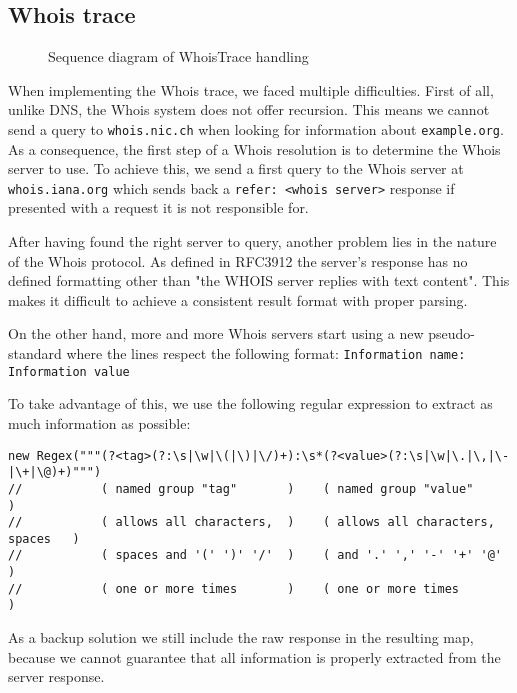 \documentclass[
	a4paper,					10pt,							twoside,					openright,				notitlepage,			parskip=half,			]{scrreprt}
\begin{document}
\subsection{Whois trace}
\label{subsec:api_libstruct_whois}

\begin{figure}[H] 
\caption{Sequence diagram of WhoisTrace handling}
\label{fig:seq-whoistrace}
\end{figure}

When implementing the Whois trace, we faced multiple difficulties. First of all, unlike \gls{DNS}, the Whois system
does not offer recursion. This means we cannot send a query to \verb|whois.nic.ch| when looking for information about
\verb|example.org|. As a consequence, the first step of a Whois resolution is to determine the Whois server to use. 
To achieve this, we send a first query to the Whois server at \verb|whois.iana.org| which sends 
back a \verb|refer: <whois server>| response if presented with a request it is not responsible for. 

After having found the right server to query, another problem lies in the nature of the Whois protocol. 
As defined in \gls{RFC}3912\cite{rfc:whois} the server's response has no defined formatting other than 
"the WHOIS server replies with text content". This makes it difficult to 
achieve a consistent result format with proper parsing.

On the other hand, more and more Whois servers start using a new pseudo-standard where
the lines respect the following format: \verb|Information name:  Information value| 

\newpage
To take advantage of this, we use the following 
regular expression to extract as much information as possible:

\begin{lstlisting}[language={}]
new Regex("""(?<tag>(?:\s|\w|\(|\)|\/)+):\s*(?<value>(?:\s|\w|\.|\,|\-|\+|\@)+)""")
//           ( named group "tag"       )    ( named group "value"             )
//           ( allows all characters,  )    ( allows all characters, spaces   )
//           ( spaces and '(' ')' '/'  )    ( and '.' ',' '-' '+' '@'         )
//           ( one or more times       )    ( one or more times               )
\end{lstlisting}

As a backup solution we still include the raw response in the resulting map, 
because we cannot guarantee that all information is properly
extracted from the server response.
\end{document}
